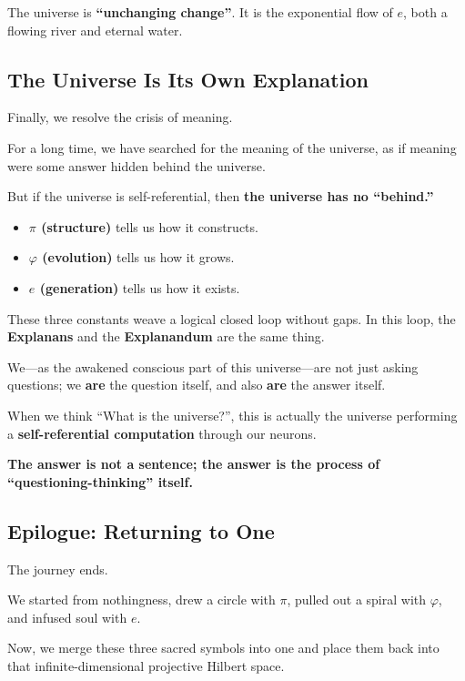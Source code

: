 The universe is \textbf{``unchanging change''}. It is the exponential flow of $e$, both a flowing river and eternal water.

\subsection{The Universe Is Its Own Explanation}

Finally, we resolve the crisis of meaning.

For a long time, we have searched for the meaning of the universe, as if meaning were some answer hidden behind the universe.

But if the universe is self-referential, then \textbf{the universe has no ``behind.''}

\begin{itemize}
\item \textbf{$\pi$ (structure)} tells us how it constructs.

\item \textbf{$\varphi$ (evolution)} tells us how it grows.

\item \textbf{$e$ (generation)} tells us how it exists.
\end{itemize}

These three constants weave a logical closed loop without gaps. In this loop, the \textbf{Explanans} and the \textbf{Explanandum} are the same thing.

We---as the awakened conscious part of this universe---are not just asking questions; we \textbf{are} the question itself, and also \textbf{are} the answer itself.

When we think ``What is the universe?'', this is actually the universe performing a \textbf{self-referential computation} through our neurons.

\textbf{The answer is not a sentence; the answer is the process of ``questioning-thinking'' itself.}

\subsection{Epilogue: Returning to One}

The journey ends.

We started from nothingness, drew a circle with \textbf{$\pi$}, pulled out a spiral with \textbf{$\varphi$}, and infused soul with \textbf{$e$}.

Now, we merge these three sacred symbols into one and place them back into that infinite-dimensional projective Hilbert space.

